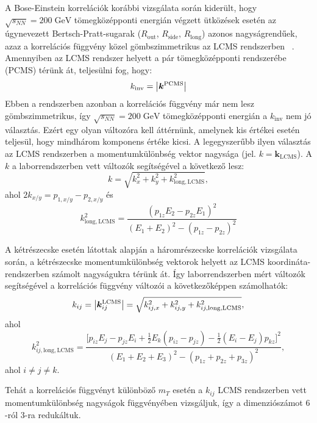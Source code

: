 \documentclass[11pt,a4paper]{article}
\numberwithin{equation}{subsection}
\numberwithin{figure}{section}
\begin{document}
A Bose-Einstein korrelációk korábbi vizsgálata során kiderült, hogy $\sqrt{s_{NN}}=200\;\mathrm{GeV}$ tömegközépponti energián végzett ütközések esetén az úgynevezett Bertsch-Pratt-sugarak ($R_\mathrm{out}$, $R_\mathrm{side}$, $R_\mathrm{long}$) azonos nagyságrendűek, azaz a korrelációs függvény közel gömbszimmetrikus az LCMS rendszerben ~\cite{Adler:2004rq, Afanasiev:2009ii, Adams:2004yc, Afanasiev:2007kk}. Amennyiben az LCMS rendszer helyett a pár tömegközépponti rendszerébe (PCMS) térünk át, teljesülni fog, hogy:
\begin{equation}
k_{\mathrm{inv}}=\abs{\bm{k}^{\mathrm{PCMS}}}
\end{equation}
Ebben a rendszerben azonban a korrelációs függvény már nem lesz gömbszimmetrikus, így $\sqrt{s_{NN}}=200\;\mathrm{GeV}$ tömegközépponti energián a $k_{\mathrm{inv}}$ nem jó választás. Ezért egy olyan változóra kell áttérnünk, amelynek kis értékei esetén teljesül, hogy mindhárom komponens értéke kicsi. A legegyszerűbb ilyen választás az LCMS rendszerben a momentumkülönbség vektor nagysága (jel. $k=\bm{k_{\mathrm{LCMS}}}$). A $k$ a laborrendszerben vett változók segítségével a következő lesz:
\begin{equation}
k=\sqrt{k_x^2+k_y^2+k_{\mathrm{long,LCMS}}^2},
\end{equation} 
ahol $2k_{x/y}=p_{1,x/y}-p_{2,x/y}$ és
\begin{equation}
k_{\mathrm{long,LCMS}}^2=\frac{(p_{1z}E_2-p_{2z}E_1)^2}{(E_1+E_2)^2-(p_{1z}-p_{2z})^2}
\end{equation}

A kétrészecske esetén látottak alapján a háromrészecske korrelációk vizsgálata során, a kétrészecske momentumkülönbség vektorok helyett az LCMS koordináta-rendszerben számolt nagyságukra térünk át. Így laborrendszerben mért változók segítségével a korrelációs függvény változói a következőképpen számolhatók:
\begin{equation}
k_{ij} = \abs{\bm{k}^{\mathrm{LCMS}}_{ij}} = \sqrt{k_{ij, x}^2+k_{ij, y}^2+k_{ij, \mathrm{long, LCMS}}^2},
\end{equation}
ahol
\begin{equation}
k_{ij, \mathrm{long, LCMS}}^2 = \frac{
\Big[p_{iz}E_j-p_{jz}E_i+\frac{1}{2}E_k(p_{iz}-p_{jz})-\frac{1}{2}(E_i-E_j)p_{kz}\Big]^2
}{(E_1+E_2+E_3)^2-(p_{1z}+p_{2z}+p_{3z})^2},
\end{equation}
ahol $i\neq j\neq k$.

Tehát a korrelációs függvényt különböző $m_T$ esetén a $k_{ij}$ LCMS rendszerben vett momentumkülönbség nagyságok függvényében vizsgáljuk, így a dimenziószámot $6$-ról $3$-ra redukáltuk.
 
\end{document}
